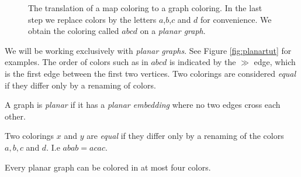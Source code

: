 \begin{figure}[!h]
    \caption{The translation of a map coloring to a graph coloring. In the last step we replace colors by the letters $a$,$b$,$c$ and $d$ for convenience. We obtain the coloring called $abcd$ on a \textit{planar graph}. }
    \label{fig:colortut}
\end{figure}

We will be working exclusively with \textit{planar graphs}. See Figure \ref{fig:planartut} for examples. The order of colors such as in $abcd$ is indicated by the $\gg$ edge, which is the first edge between the first two vertices. Two colorings are considered \textit{equal} if they differ only by a renaming of colors.

\begin{definition}
    A graph is \emph{planar} if it has a \emph{planar embedding} where no two edges cross each other.
\end{definition}
\begin{definition}
    \label{def:coleq}
    Two colorings $x$ and $y$ are \emph{equal} if they differ only by a renaming of the colors $a,b,c$ and $d$. I.e $abab = acac$.
\end{definition}

\begin{theorem}
    Every planar graph can be colored in at most four colors.
\end{theorem}


